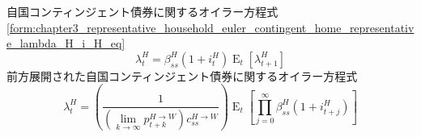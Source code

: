 自国コンティンジェント債券に関するオイラー方程式
\eqref{form:chapter3_representative_household_euler_contingent_home_representative_lambda_H_i_H_eq}
\begin{equation}
\label{form:chapter5_a_shock_policies_overview_euler_contingent_eq}
    \lambda_t^H=\beta_{ss}^H(1+i_t^H)\operatorname{E}_t[\lambda_{t+1}^H]
\end{equation}
前方展開された自国コンティンジェント債券に関するオイラー方程式
\begin{equation}
\label{form:chapter5_a_shock_policies_overview_euler_contingent_lim_eq}
    \lambda_t^H=\left(\frac{1}{(\lim_{k\to\infty}p_{t+k}^{H\to W})c_{ss}^{H\to W}}\right)\operatorname{E}_t\left[\prod_{j=0}^{\infty}\beta_{ss}^H(1+i_{t+j}^H)\right]
\end{equation}